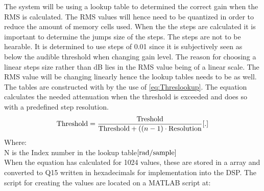 The system will be using a lookup table to determined the correct gain when the RMS is calculated. The RMS values will hence need to be quantized in order to reduce the amount of memory cells used. When the the steps are calculated it is important to determine the jumps size of the steps. The steps are not to be hearable. It is determined to use steps of 0.01 since it is subjectively seen as below the audible threshold when changing gain level. The reason for choosing a linear steps size rather than dB lies in the RMS value being of a linear scale. The RMS value will be changing linearly hence the lookup tables needs to be as well. The tables are constructed with by the use of \autoref{eq:Threslookup}. The equation calculates the needed attenuation when the threshold is exceeded and does so with a predefined step resolution. 
\vspace{-2mm}
\begin{equation}\label{eq:Threslookup}
\text{Threshold}=\frac{\text{Treshold}}{\text{Threshold}+((n-1) \cdot \text{Resolution}}\enhed{.}
\end{equation}
Where:\\
N is the Index number in the lookup table$\enhed{rad/sample}$\\

\vspace{2mm}
When the equation has calculated for 1024 values, these are stored in a array and converted to Q15 written in hexadecimals for implementation into the DSP.
The script for creating the values are located on a MATLAB script at: \\







